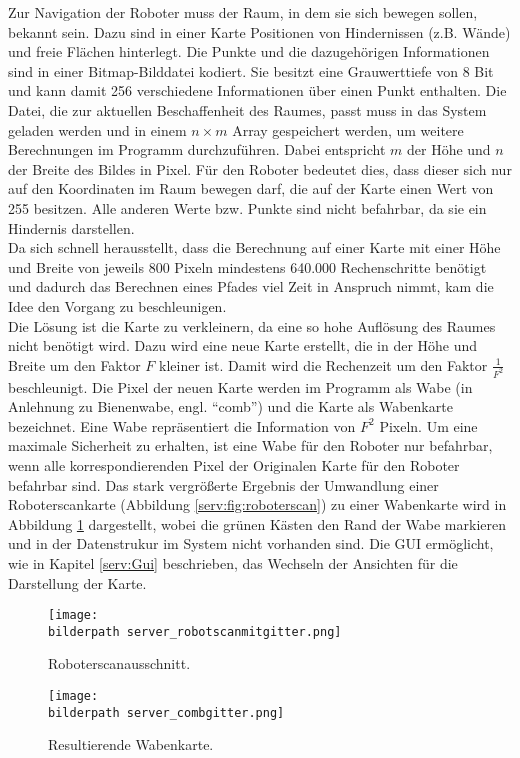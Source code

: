 Zur Navigation der Roboter muss der Raum, in dem sie sich bewegen sollen,
bekannt sein. Dazu sind in einer Karte Positionen von Hindernissen (z.B. Wände)
und freie Flächen hinterlegt. Die Punkte und die dazugehörigen Informationen
sind in einer Bitmap-Bilddatei kodiert. Sie besitzt eine Grauwerttiefe von 8
Bit und kann damit 256 verschiedene Informationen über einen Punkt enthalten.
Die Datei, die zur aktuellen Beschaffenheit des Raumes, passt muss in das System geladen werden und in einem $n\times m$ Array gespeichert werden, um weitere Berechnungen im Programm durchzuführen. Dabei entspricht $m$ der Höhe und $n$ der Breite des Bildes in Pixel. Für den Roboter bedeutet dies, dass dieser sich nur auf den Koordinaten im Raum bewegen darf, die auf der Karte einen Wert von 255 besitzen. Alle anderen Werte bzw. Punkte sind nicht befahrbar, da sie ein Hindernis darstellen. \\
Da sich schnell herausstellt, dass die Berechnung auf einer Karte mit einer Höhe und Breite von jeweils 800 Pixeln mindestens 640.000 Rechenschritte benötigt und dadurch das Berechnen eines Pfades viel Zeit in Anspruch nimmt, kam die Idee den Vorgang zu beschleunigen. \\
Die Lösung ist die Karte zu verkleinern, da eine so hohe Auflösung des Raumes
nicht benötigt wird. Dazu wird eine neue Karte erstellt, die in der Höhe und
Breite um den Faktor $F$ kleiner ist. Damit wird die Rechenzeit um den Faktor
$\frac{1}{F^2}$ beschleunigt. Die Pixel der neuen Karte werden im Programm als
Wabe (in Anlehnung zu Bienenwabe, engl. "`comb"') und die Karte als Wabenkarte
bezeichnet. Eine Wabe repräsentiert die Information von $F^2$ Pixeln. Um eine
maximale Sicherheit zu erhalten, ist eine Wabe für den Roboter nur befahrbar,
wenn alle korrespondierenden Pixel der Originalen Karte für den Roboter
befahrbar sind. Das stark vergrößerte Ergebnis der  Umwandlung einer
Roboterscankarte (Abbildung \ref{serv:fig:roboterscan}) zu einer Wabenkarte
wird in Abbildung \ref{serv:fig:wabenkarte} dargestellt, wobei die grünen Kästen den Rand der Wabe markieren und in der Datenstrukur im System nicht vorhanden sind. Die GUI ermöglicht, wie in Kapitel \ref{serv:Gui} beschrieben, das Wechseln der Ansichten für die Darstellung der Karte.

\begin{figure}[H]
	\begin{minipage}[b]{8cm} 	
	\centering
	\texttt{[image: \\bilderpath server\_robotscanmitgitter.png]}
	\caption{Roboterscanausschnitt.}
	\label{serv:fig:roboterscan}
	\end{minipage}
	\hfill	
	\begin{minipage}[b]{8cm} 
	\centering	
	\texttt{[image: \\bilderpath server\_combgitter.png]}
	\caption{Resultierende Wabenkarte.}
	\label{serv:fig:wabenkarte}
	\end{minipage}
\end{figure}

